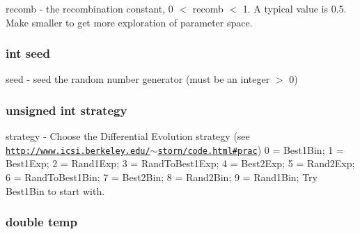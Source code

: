 \label{structgencurvefit_options_ac0204c26d2cd7eb82bc13c199d03461e}
recomb -\/ the recombination constant, 0 $<$ recomb $<$ 1. A typical value is 0.5. Make smaller to get more exploration of parameter space. \hypertarget{structgencurvefit_options_a1447ad288a0a73454510f5777bdc3ed1}{
\subsubsection[{seed}]{\setlength{\rightskip}{0pt plus 5cm}int {\bf seed}}}
\label{structgencurvefit_options_a1447ad288a0a73454510f5777bdc3ed1}
seed -\/ seed the random number generator (must be an integer $>$ 0) \hypertarget{structgencurvefit_options_a09885471db33b126d97901a29aea53c4}{
\subsubsection[{strategy}]{\setlength{\rightskip}{0pt plus 5cm}unsigned int {\bf strategy}}}
\label{structgencurvefit_options_a09885471db33b126d97901a29aea53c4}
strategy -\/ Choose the Differential Evolution strategy (see \href{http://www.icsi.berkeley.edu/~storn/code.html#prac}{\tt http://www.icsi.berkeley.edu/$\sim$storn/code.html\#prac}) 0 = Best1Bin; 1 = Best1Exp; 2 = Rand1Exp; 3 = RandToBest1Exp; 4 = Best2Exp; 5 = Rand2Exp; 6 = RandToBest1Bin; 7 = Best2Bin; 8 = Rand2Bin; 9 = Rand1Bin; Try Best1Bin to start with. \hypertarget{structgencurvefit_options_a9fb78358ae4b0a049a0d1b37dc4cffec}{
\subsubsection[{temp}]{\setlength{\rightskip}{0pt plus 5cm}double {\bf temp}}}
\label{structgencurvefit_options_a9fb78358ae4b0a049a0d1b37dc4cffec}
